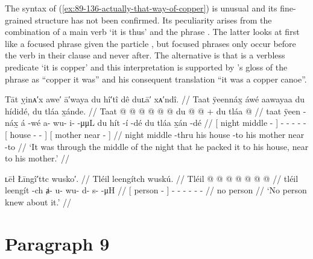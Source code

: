 The syntax of (\ref{ex:89-136-actually-that-way-of-copper}) is unusual and its fine-grained structure has not been confirmed.
Its peculiarity arises from the combination of a main verb  ‘it is thus’ and the phrase .
The latter looks at first like a focused phrase given the particle , but focused phrases only occur before the verb in their clause and never after.
The alternative is that  is a verbless predicate ‘it is copper’ and this interpretation is supported by \citeauthor{swanton:1909}’s gloss of the phrase as “copper it was” and his consequent translation “it was a copper canoe”.

\ex\label{ex:89-138-night-pack-home-to-mother}%
%
\begingl
	\glpreamble	Tāt ỵinᴀ′x awe′ ā′waya du hî′tî dê duʟā′ xᴀ′ndî. //
	\glpreamble	Taat ÿeennáx̱ áwé aawayaa du hídidé, du tláa x̱ánde. //
	\gla	{} Taat  @ {} {}  @ {}
		 @ {} @ {} @ {} @ {}
		{} du  @ {} @ {} {} +
		{} du tláa  @ {} {} //
	\glb	{} taat ÿeen -náx̱ {} á -wé
		a- wu- i-  -μμL
		{} du hít -í -dé {}
		{} du tláa x̱án -dé {} //
	\glc	{}[ night middle - {}]  -
		- - -  -
		{}[  house - - {}]
		{}[  mother near - {}] //
	\gld	{} night middle -thru {}  {}
		 {} {} {} {}
		{} his house {} -to {}
		{} his mother near -to {} //
	\glft	‘It was through the middle of the night that he packed it to his house, near to his mother.’
		//
\endgl
\xe

\ex\label{ex:89-139-nobody-knew}%
%
\begingl
	\glpreamble	ʟēł Łīngî′ttc wusko′. //
	\glpreamble	Tléil leengítch wuskú. //
	\gla	Tléil {}  @ {} {}
		 @ {} @ {} @ {} @ {} @ {} @ {} //
	\glb	tléil {} leengít -ch {}
		ⱥ- u- wu- d- s-  -μH //
	\glc	{} {}[ person - {}]
		- - - - -  - //
	\gld	no {} person {} {} 
		 {} {} {} {} {} {} //
	\glft	‘No person knew about it.’
		//
\endgl
\xe

\section{Paragraph 9}\label{sec:89-para-9}

